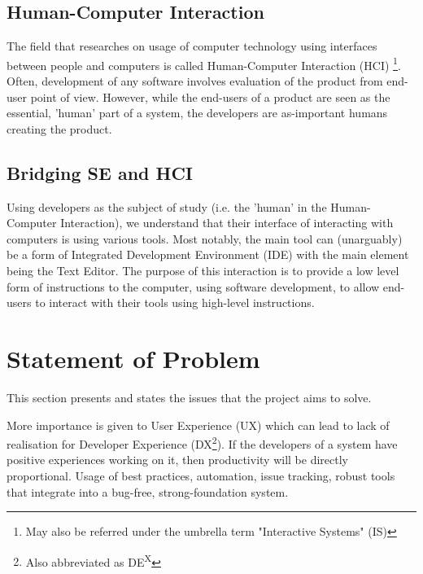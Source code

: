 \documentclass{mprop}
\begin{document}
\subsection{Human-Computer Interaction}

The field that researches on usage of computer technology using interfaces between people and computers is called Human-Computer Interaction (HCI) \footnote{May also be referred under the umbrella term "Interactive Systems" (IS)}. Often, development of any software involves evaluation of the product from end-user point of view. However, while the end-users of a product are seen as the essential, 'human' part of a system, the developers are as-important humans creating the product.

\subsection{Bridging SE and HCI}

Using developers as the subject of study (i.e. the 'human' in the Human-Computer Interaction), we understand that their interface of interacting with computers is using various tools. Most notably, the main tool can (unarguably) be a form of Integrated Development Environment (IDE) with the main element being the Text Editor. The purpose of this interaction is to provide a low level form of instructions to the computer, using software development, to allow end-users to interact with their tools using high-level instructions.

\section{Statement of Problem}




This section presents and states the issues that the project aims to solve.

More importance is given to User Experience (UX) which can lead to lack of realisation for Developer Experience (DX\footnote{Also abbreviated as DE\textsuperscript{X}}). If the developers of a system have positive experiences working on it, then productivity will be directly proportional. Usage of best practices, automation, issue tracking, robust tools that integrate into a bug-free, strong-foundation system.
\end{document}

